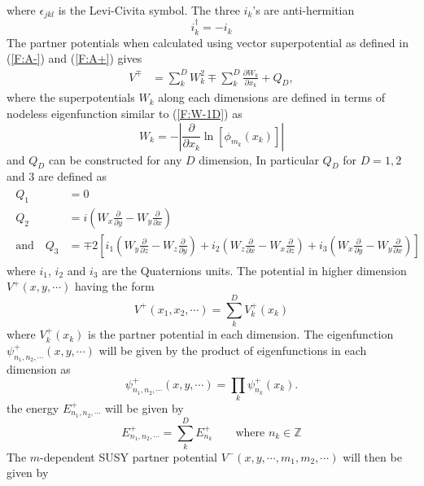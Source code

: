 \documentclass[12pt]{article}
\numberwithin{equation}{section} %
\begin{document}
where \( \epsilon_{jkl} \) is the Levi-Civita symbol. The three $i_k$'s are anti-hermitian
\[i_k^{\dagger}=-i_k\]
The partner potentials when calculated using vector superpotential as defined in (\ref{F:A-}) and (\ref{F:A+}) gives
\begin{align}\label{F:V-W}
    V^{\mp} &= \sum_{k}^{D}W_k^2 \mp \sum_{k}^{D}\frac{\partial W_k}{\partial x_k} + Q_D,
\end{align}
where the superpotentials \( W_k \) along each dimensions are defined in terms of nodeless eigenfunction  similar to (\ref{F:W-1D}) as
\begin{equation}\label{F:W}
    W_k = -\left|\frac{\partial}{\partial x_k}\ln[\phi_{m_k}(x_k)]\right|
\end{equation} 
and \( Q_D \) can be constructed for any $D$ dimension, In particular $Q_D$ for $D=1,2$ and $3$ are defined as
\begin{align}\label{F:Q}
    \begin{split}
    Q_1 &= 0\\
    Q_2 &= i \left(W_x \frac{\partial}{\partial y} - W_y \frac{\partial}{\partial x}\right) \\
    \text{and}\quad Q_3 &= \mp 2\left[i_1 \left(W_y \frac{\partial}{\partial z} - W_z \frac{\partial}{\partial y}\right) + i_2 \left(W_z \frac{\partial}{\partial x} - W_x \frac{\partial}{\partial z}\right) + i_3 \left(W_x \frac{\partial}{\partial y} - W_y \frac{\partial}{\partial x}\right)\right]
    \end{split}
\end{align}
where \(i_1\), \(i_2\) and \(i_3\) are the Quaternions units. 
The potential in higher dimension $V^+(x,y,\cdots)$ having the form
\begin{equation}\label{F:V+}
    V^+(x_1,x_2,\cdots) = \sum_{k}^{D}V_k^+(x_k)
\end{equation}
where $V_k^+(x_k)$ is the partner potential in each dimension. The eigenfunction $\psi^+_{n_1,n_2,\cdots}(x,y,\cdots)$ will be given by the product of eigenfunctions in each dimension as
\begin{equation}\label{F:psi+}
    \psi^+_{n_1,n_2,\cdots}(x,y,\cdots) = \prod_{k}\psi^+_{n_k}(x_k).
\end{equation}
the energy $E^+_{n_1,n_2,\cdots}$ will be given by
\begin{equation}\label{F:E+}
    E^+_{n_1,n_2,\cdots} = \sum_{k}^{D}E^+_{n_k}\qquad \text{where }n_k\in \mathbb{Z}
\end{equation}
The $m$-dependent SUSY partner potential $V^-(x,y,\cdots,m_1,m_2,\cdots)$ will then be given by
\end{document}
